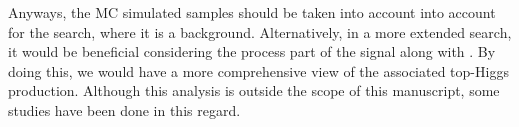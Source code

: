 Anyways, the MC simulated \tWH samples should be taken into account into account
for the \tHq search, where it is a background. Alternatively, in a more extended \tH search,
it would be beneficial considering the \tWH process part of the signal along with \tHq. 
By doing this, we would have a more comprehensive view of the associated
top-Higgs production. Although this analysis is outside the scope of this manuscript, 
some studies have been done in this regard.



